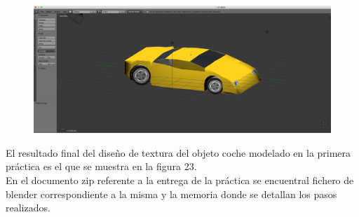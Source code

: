 \documentclass[10pt]{article}
\begin{document}
\begin{figure}[H]
	\begin{center}
	 		\includegraphics[width = 1.00\textwidth]{Imagenes/p3-img23}
	\end{center} 
\end{figure}

El resultado final del diseño de textura del objeto coche modelado en la primera práctica es el que se muestra en la figura 23. \\


En el documento zip referente a la entrega de la práctica se encuentral fichero de blender correspondiente a la misma y la memoria donde se detallan los pasos realizados.
\end{document}
